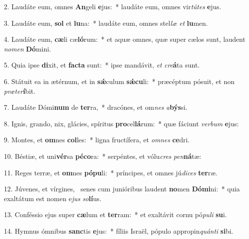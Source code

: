2. Laudáte eum, omnes \textbf{An}geli \textbf{e}jus:~*  laudáte eum, omnes vir\textit{tú}\textit{tes} \textbf{e}jus.\

3. Laudáte eum, \textbf{sol} et \textbf{lu}na:~*  laudáte eum, omnes stel\textit{læ} \textit{et} \textbf{lu}men.\

4. Laudáte eum, \textbf{cæ}li cæ\textbf{ló}rum:~*  et aquæ omnes, quæ super cælos sunt, laudent \textit{no}\textit{men} \textbf{Dó}mini.\

5. Quia ipse \textbf{di}xit, et \textbf{fac}\textbf{ta} sunt:~*  ipse mandávit, \textit{et} \textit{cre}\textbf{á}ta sunt.\

6. Státuit ea in ætérnum, et in \textbf{sǽ}culum \textbf{sǽ}\textbf{cu}li:~*  præcéptum pósuit, et non \textit{præ}\textit{ter}\textbf{í}bit.\

7. Laudáte Dómi\textbf{num} de \textbf{ter}ra,~*  dracónes, et om\textit{nes} \textit{a}\textbf{býs}si.\

8. Ignis, grando, nix, glácies, spíritus \textbf{pro}cel\textbf{lá}rum:~*  quæ fáciunt \textit{ver}\textit{bum} \textbf{e}jus:\

9. Montes, et \textbf{om}nes \textbf{col}les:~*  ligna fructífera, et \textit{om}\textit{nes} \textbf{ce}dri.\

10. Béstiæ, et uni\textbf{vér}sa \textbf{pé}\textbf{co}ra:~*  serpéntes, et vólu\textit{cres} \textit{pen}\textbf{ná}tæ:\

11. Reges terræ, et \textbf{om}nes \textbf{pó}\textbf{pu}li:~*  príncipes, et omnes jú\textit{di}\textit{ces} \textbf{ter}ræ.\

12. Júvenes, et vírgines, \dag\  senes cum junióribus laudent \textbf{no}men \textbf{Dó}\textbf{mi}ni:~*  quia exaltátum est nomen e\textit{jus} \textit{so}\textbf{lí}us.\

13. Conféssio ejus super \textbf{cæ}lum et \textbf{ter}ram:~*  et exaltávit cornu pó\textit{pu}\textit{li} \textbf{su}i.\

14. Hymnus ómnibus \textbf{sanc}tis \textbf{e}jus:~*  fíliis Israël, pópulo appropin\textit{quán}\textit{ti} \textbf{si}bi.\

